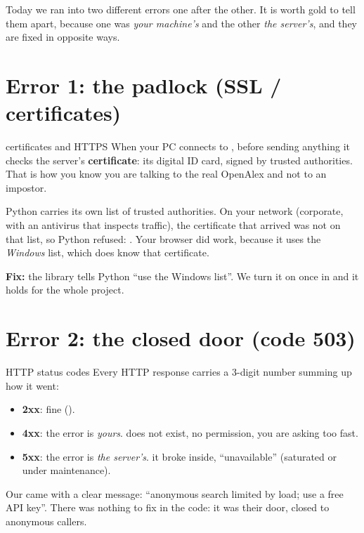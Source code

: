 \documentclass[11pt,a4paper]{article}
\begin{document}

Today we ran into two different errors one after the other. It is worth gold to tell them
apart, because one was \emph{your machine's} and the other \emph{the server's}, and they are
fixed in opposite ways.

\section{Error 1: the padlock (SSL / certificates)}

\begin{concepto}{certificates and HTTPS}
When your PC connects to , before sending anything it checks
the server's \textbf{certificate}: its digital ID card, signed by trusted authorities. That
is how you know you are talking to the real OpenAlex and not to an impostor.

Python carries its own list of trusted authorities. On your network (corporate, with an
antivirus that inspects traffic), the certificate that arrived was not on that list, so
Python refused: . Your browser did work, because it uses
the \emph{Windows} list, which does know that certificate.

\textbf{Fix:} the  library tells Python ``use the Windows list''. We turn
it on once in  and it holds for the whole project.
\end{concepto}

\section{Error 2: the closed door (code 503)}

\begin{concepto}{HTTP status codes}
Every HTTP response carries a 3-digit number summing up how it went:
\begin{itemize}
  \item \textbf{2xx}: fine ().
  \item \textbf{4xx}: the error is \emph{yours}.  does not exist,  no
        permission,  you are asking too fast.
  \item \textbf{5xx}: the error is \emph{the server's}.  it broke inside,
         ``unavailable'' (saturated or under maintenance).
\end{itemize}
Our  came with a clear message: ``anonymous search limited by load; use a free
API key''. There was nothing to fix in the code: it was their door, closed to anonymous
callers.
\end{concepto}
\end{document}
